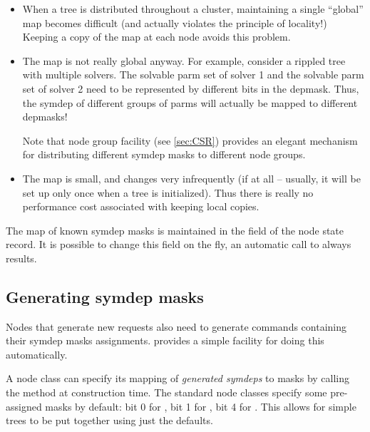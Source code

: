   \begin{itemize}
  
  \item When a tree is distributed throughout a cluster, maintaining a single
    ``global'' map becomes difficult (and actually violates the principle of
    locality!) Keeping a copy of the map at each node avoids this problem.

  \item The map is not really global anyway. For example, consider a rippled
    tree with multiple solvers. The solvable parm set of solver 1 and the
    solvable parm set of solver 2 need to be represented by different bits in
    the depmask. Thus, the  symdep of different groups of
    parms will actually be mapped to different depmasks!
    
    Note that node group facility (see \ref{sec:CSR}) provides an elegant
    mechanism for distributing different symdep masks to different node groups.

  \item The map is small, and changes very infrequently (if at all -- usually,
    it will be set up only once when a tree is initialized). Thus there is
    really no performance cost associated with keeping local copies.

  \end{itemize}
  
  The map of known symdep masks is maintained in the  field of
  the node state record. It is possible to change this field on the fly, an
  automatic call to  always results.

\subsection{Generating symdep masks}
\label{sec:gensymdeps}

  Nodes that generate new requests also need to generate 
  commands containing their symdep masks assignments.  provides a
  simple facility for doing this automatically.
  
  A node class can specify its mapping of {\em generated symdeps} to masks by
  calling the  method at construction time. The standard
  node classes specify some pre-assigned masks by default: bit 0 for
  , bit 1 for , bit 4 for . This
  allows for simple trees to be put together using just the defaults.

